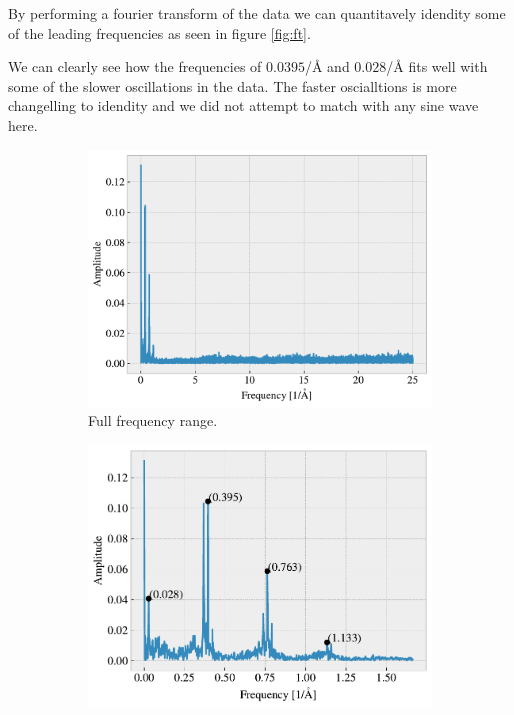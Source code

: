 By performing a fourier transform of the data we can quantitavely idendity some of the leading frequencies as seen in figure \ref{fig:ft}. 


We can clearly see how the frequencies of $0.0395$/Å and $0.028$/Å fits well with some of the slower oscillations in the data. The faster oscialltions is more changelling to idendity and we did not attempt to match with any sine wave here. 


\begin{figure}[H]
  \centering
  \begin{subfigure}[b]{0.49\textwidth}
      \centering
      \includegraphics[width=\textwidth]{figures/baseline/ft.pdf}
      \caption{Full frequency range.}
      \label{fig:ft_a}
  \end{subfigure}
  \hfill
  \begin{subfigure}[b]{0.49\textwidth}
      \centering
      \includegraphics[width=\textwidth]{figures/baseline/ft_zoom.pdf}

\end{subfigure}
\end{figure}
